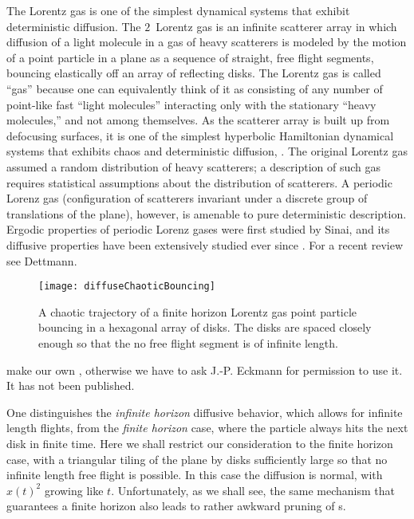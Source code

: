 The Lorentz gas is one of the simplest dynamical
systems that exhibit deterministic diffusion. The $2$\dmn\ Lorentz gas
is an infinite scatterer array in which diffusion of a light molecule
in a gas of heavy scatterers is modeled by the motion of a point
particle in a plane as a sequence of straight, free flight segments,
bouncing elastically off an array of reflecting disks. The Lorentz gas
is called ``gas'' because one can equivalently think of it as
consisting of any number of point-like fast ``light molecules''
interacting only with the stationary ``heavy molecules,'' and not
among themselves.  As the scatterer array is built up from defocusing
surfaces, it is one of the simplest hyperbolic Hamiltonian dynamical
systems that exhibits chaos and deterministic diffusion,
. The original Lorentz gas
assumed a random distribution of heavy scatterers; a description of
such gas requires statistical assumptions about the distribution of
scatterers. A periodic Lorenz gas (configuration of scatterers
invariant under a discrete group of translations of the plane),
however, is amenable to pure deterministic description. Ergodic
properties of periodic Lorenz gases were first studied by
Sinai, and its diffusive properties have been extensively
studied ever since%
.
 For a recent review  see Dettmann.

\begin{figure}[htbp]
	\begin{center}
		\texttt{[image: diffuseChaoticBouncing]}
	\end{center}
	\caption[]{\label{fig-chaoticBouncing}
		A chaotic trajectory of a finite horizon Lorentz gas
		point particle bouncing in a
		hexagonal array of disks. The disks are spaced closely enough
		so that the no free flight segment is of infinite length.
	}
\end{figure}
     {make our own , otherwise
	we have to ask J.-P. Eckmann for permission to use it. It has not been
	published.
    }

One distinguishes
the {\em infinite horizon} diffusive behavior, which allows for infinite
length flights, from
the {\em finite horizon} case, where the particle always
hits the next disk in finite time.
Here we shall restrict our consideration to the finite horizon case, with
a triangular tiling of the plane by disks sufficiently large so that no
infinite length free flight is possible. In this case the diffusion is
normal, with $\hat{x}(t)^2$ growing like $t$.
Unfortunately, as we shall see,
the same mechanism that guarantees a finite horizon
also leads to rather awkward pruning of \po s.


